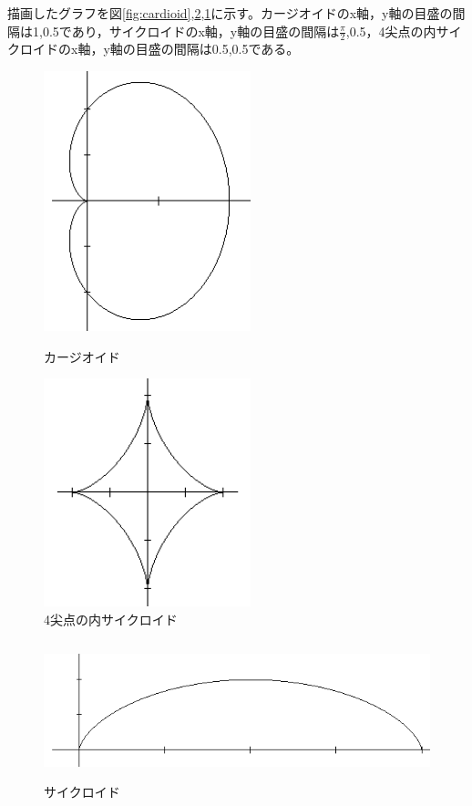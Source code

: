 \documentclass[]{jsarticle}
\begin{document}
描画したグラフを図\ref{fig:cardioid},\ref{fig:cycloid},\ref{fig:hypocycloid}に示す。カージオイドのx軸，y軸の目盛の間隔は1,0.5であり，サイクロイドのx軸，y軸の目盛の間隔は$\frac{\pi}{2}$,0.5，4尖点の内サイクロイドのx軸，y軸の目盛の間隔は0.5,0.5である。
\begin{figure}[htbp]
\begin{center}
\begin{minipage}[b]{0.45\textwidth}
  \begin{center}
    \includegraphics[width=6cm,keepaspectratio]{cardioid.png}
    \caption{カージオイド}
    \label{fig:cardioid}
  \end{center}
\end{minipage}
\begin{minipage}[b]{0.45\textwidth}
  \begin{center}
    \includegraphics[width=6cm,keepaspectratio]{hypocycloid.png}
    \caption{4尖点の内サイクロイド}
    \label{fig:hypocycloid}
  \end{center}
\end{minipage}
\end{center}
\end{figure}
\begin{figure}
\begin{center}
\includegraphics[height=4cm,keepaspectratio]{cycloid.png}
    \caption{サイクロイド}
    \label{fig:cycloid}
\end{center}
\end{figure}
\end{document}
